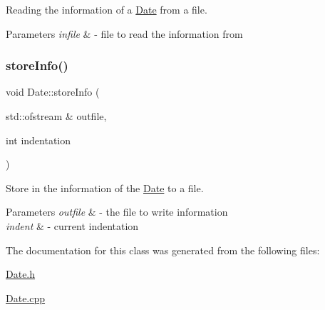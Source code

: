Reading the information of a \mbox{\hyperlink{class_date}{Date}} from a file. 


\begin{DoxyParams}{Parameters}
{\em infile} & -\/ file to read the information from \\
\hline
\end{DoxyParams}
\mbox{\label{class_date_a9385a826469d0978e3491bdff9739f6f}} 
\subsubsection{\texorpdfstring{store\+Info()}{storeInfo()}}
{\footnotesize\ttfamily void Date\+::store\+Info (\begin{DoxyParamCaption}\item[{std\+::ofstream \&}]{outfile,  }\item[{int}]{indentation }\end{DoxyParamCaption})}



Store in the information of the \mbox{\hyperlink{class_date}{Date}} to a file. 


\begin{DoxyParams}{Parameters}
{\em outfile} & -\/ the file to write information \\
\hline
{\em indent} & -\/ current indentation \\
\hline
\end{DoxyParams}


The documentation for this class was generated from the following files\+:\begin{DoxyCompactItemize}
\item 
\mbox{\hyperlink{_date_8h}{Date.\+h}}\item 
\mbox{\hyperlink{_date_8cpp}{Date.\+cpp}}\end{DoxyCompactItemize}
